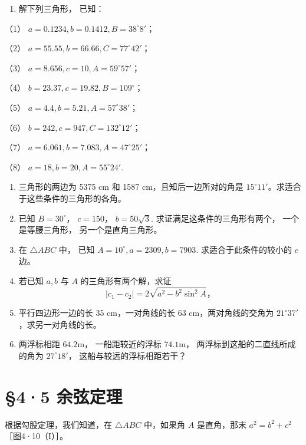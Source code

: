 \begin{enumerate}[start=2]
\item
  解下列三角形， 已知：
\end{enumerate}

（1） \(a = 0.1234, b = 0.1412, B = 38^{\circ}8'\)；

（2） \(a = 55.55, b = 66.66, C = 77^{\circ}42'\)；

（3） \(a = 8.656, c = 10, A = 59^{\circ}57'\)；

（4） \(b = 23.37, c = 19.82, B = 109^{\circ}\)；

（5） \(a = 4.4, b = 5.21, A = 57^{\circ}38'\)；

（6） \(b = 242, c = 947, C = 132^{\circ}12'\)；

（7） \(a = 6.061, b = 7.083, A = 47^{\circ}25'\)；

（8） \(a = 18, b = 20, A = 55^{\circ}24'\).

\begin{enumerate}[start=3]
\item
  三角形的两边为 5375 cm 和 1587 cm，且知后一边所对的角是
  \(15^{\circ}11'\)。求适合于这些条件的三角形的各角。
\item
  已知 \(B = 30^{\circ}\)， \(c = 150\)， \(b = 50\sqrt{3}\).
  求证满足这条件的三角形有两个， 一个是等腰三角形， 另一个是直角三角形。
\item
  在 \(\triangle ABC\) 中， 已知 \(A = 10^{\circ}, a = 2309, b = 7903\).
  求适合于此条件的较小的 \(c\) 边。
\item
  若已知 \(a, b\) 与 \(A\) 的三角形有两个解，求证
\[
\left| c _ {1} - c _ {2} \right| = 2 \sqrt {a ^ {2} - b ^ {2} \sin^ {2} A}\text{，}
\]
\item
  平行四边形一边的长 35 cm，一对角线的长 63 cm，两对角线的交角为
  \(21^{\circ}37'\)，求另一对角线的长。
\item
  两浮标相距 \(64.2\mathrm{m}\)， 一船距较近的浮标 \(74.1\mathrm{m}\)，
  两浮标到这船的二直线所成的角为 \(27^{\circ}18'\)，
  这船与较远的浮标相距若干？
\end{enumerate}

\section{§4·5 余弦定理}

根据勾股定理，我们知道，在 \(\triangle ABC\) 中，如果角 \(A\)
是直角，那末 \(a^2 = b^2 + c^2\) ［图4·10（I）］。

